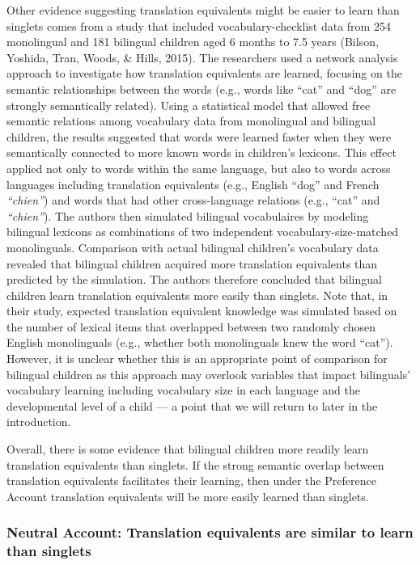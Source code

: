 \documentclass[
  english,
  ,man,floatsintext]{apa6}
\begin{document}
Other evidence suggesting translation equivalents might be easier to learn than singlets comes from a study that included vocabulary-checklist data from 254 monolingual and 181 bilingual children aged 6 months to 7.5 years (Bilson, Yoshida, Tran, Woods, \& Hills, 2015). The researchers used a network analysis approach to investigate how translation equivalents are learned, focusing on the semantic relationships between the words (e.g., words like ``cat'' and ``dog'' are strongly semantically related). Using a statistical model that allowed free semantic relations among vocabulary data from monolingual and bilingual children, the results suggested that words were learned faster when they were semantically connected to more known words in children's lexicons. This effect applied not only to words within the same language, but also to words across languages including translation equivalents (e.g., English ``dog'' and French \emph{``chien''}) and words that had other cross-language relations (e.g., ``cat'' and \emph{``chien''}). The authors then simulated bilingual vocabulaires by modeling bilingual lexicons as combinations of two independent vocabulary-size-matched monolinguals. Comparison with actual bilingual children's vocabulary data revealed that bilingual children acquired more translation equivalents than predicted by the simulation. The authors therefore concluded that bilingual children learn translation equivalents more easily than singlets. Note that, in their study, expected translation equivalent knowledge was simulated based on the number of lexical items that overlapped between two randomly chosen English monolinguals (e.g., whether both monolinguals knew the word ``cat''). However, it is unclear whether this is an appropriate point of comparison for bilingual children as this approach may overlook variables that impact bilinguals' vocabulary learning including vocabulary size in each language and the developmental level of a child --- a point that we will return to later in the introduction.

Overall, there is some evidence that bilingual children more readily learn translation equivalents than singlets. If the strong semantic overlap between translation equivalents facilitates their learning, then under the Preference Account translation equivalents will be more easily learned than singlets.

\hypertarget{neutral-account-translation-equivalents-are-similar-to-learn-than-singlets}{%
\subsubsection{Neutral Account: Translation equivalents are similar to learn than singlets}\label{neutral-account-translation-equivalents-are-similar-to-learn-than-singlets}}
\end{document}
